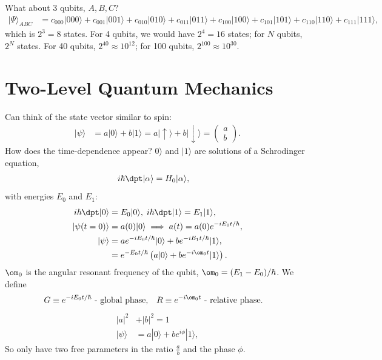 \documentclass[a4paper, 11pt, normalem]{report}
\begin{document}
What about 3 qubits, $A,B,C$?
\begin{align}
    |\Psi\rangle_{ABC} &= c_{000}|000\rangle + c_{001}|001\rangle + c_{010}|010\rangle + c_{011}|011\rangle + c_{100}|100\rangle + c_{101}|101\rangle + c_{110}|110\rangle + c_{111}|111\rangle,
\end{align}
which is $2^3=8$ states.
For 4 qubits, we would have $2^4=16$ states; for $N$ qubits, $2^N$ states.
For 40 qubits, $2^{40}\approx10^{12}$; for 100 qubits, $2^{100}\approx10^{30}$.

\chapter{Two-Level Quantum Mechanics}
Can think of the state vector similar to spin:
\begin{align}
    |\psi\rangle &= a|0\rangle + b|1\rangle = a|\uparrow\rangle + b|\downarrow\rangle = \begin{pmatrix} a \\ b\end{pmatrix}.
\end{align}
How does the time-dependence appear?
$0\rangle$ and $|1\rangle$ are solutions of a Schrodinger equation,
\begin{align}
    i\hbar\dpt|\alpha\rangle &= H_0|\alpha\rangle,
\end{align}
with energies $E_0$ and $E_1$:
\begin{align}
    i\hbar\dpt|0\rangle &= E_0|0\rangle,\; i\hbar\dpt|1\rangle = E_1|1\rangle, \\
    |\psi(t=0)\rangle &= a(0)|0\rangle \implies a(t) = a(0)e^{-iE_0t/\hbar},\\
    |\psi\rangle &= ae^{-iE_0t/\hbar}|0\rangle + be^{-iE_1t/\hbar}|1\rangle, \\
                 &= e^{-E_0t/\hbar}\left(a|0\rangle + be^{-i\om_0 t}|1\rangle\right).
\end{align}
$\om_0$ is the angular resonant frequency of the qubit, $\om_0=(E_1-E_0)/\hbar$.
We define
\begin{align}
    G &\equiv e^{-iE_0t/\hbar} \text{ - global phase}, & R &\equiv e^{-i\om_0t} \text{ - relative phase}.
\end{align}
\begin{align}
    |a|^2 &+ |b|^2 = 1 \\
    |\psi\rangle &= a|0\rangle + be^{i\phi}|1\rangle,
\end{align}
So only have two free parameters in the ratio $\frac{a}{b}$ and the phase $\phi$.
\end{document}
